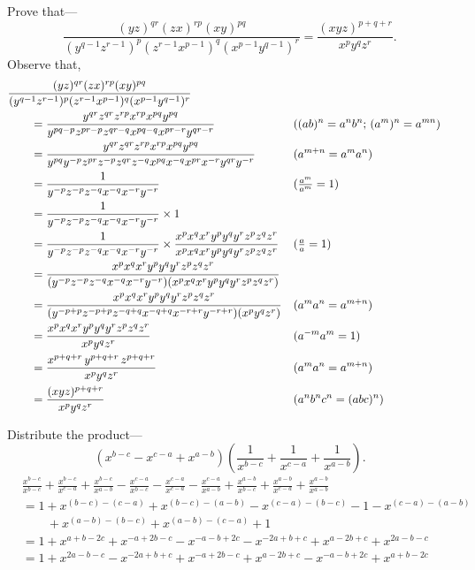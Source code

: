 \documentclass[DIN, pagenumber=false, fontsize=11pt, parskip=half]{scrartcl}
\begin{document}
\begin{problems}[from=1,step=1]
    \problem Prove that---
    \[
        \frac{(yz)^{qr} (zx)^{rp} (xy)^{pq}}{(y^{q-1} z^{r-1})^{p} (z^{r-1} x^{p-1})^{q} (x^{p-1} y^{q-1})^{r}} = \frac{(xyz)^{p+q+r}}{x^p y^q z^r}.
    \]
    \answer 
    Observe that,
    \begin{align*}
        \MoveEqLeft\frac{(yz)^{qr}(zx)^{rp}(xy)^{pq}}{(y^{q-1}z^{r-1})^p(z^{r-1}x^{p-1})^q(x^{p-1}y^{q-1})^r}\\ 
        & = \frac{y^{qr}z^{qr}z^{rp}x^{rp}x^{pq}y^{pq}}{y^{pq-p}z^{pr-p}z^{qr-q}x^{pq-q}x^{pr-r}y^{qr-r}} && \text{($(ab)^n = a^nb^n$; $(a^m)^n = a^{mn}$)}\\ 
        & = \frac{y^{qr}z^{qr}z^{rp}x^{rp}x^{pq}y^{pq}}{y^{pq}y^{-p}z^{pr}z^{-p}z^{qr}z^{-q}x^{pq}x^{-q}x^{pr}x^{-r}y^{qr}y^{-r}} && \text{($a^{m+n} = a^ma^n$)}\\ 
        &= \frac{1}{y^{-p}z^{-p}z^{-q}x^{-q}x^{-r}y^{-r}} && \text{($\tfrac{a^m}{a^m} = 1$)}\\ 
        &= \frac{1}{y^{-p}z^{-p}z^{-q}x^{-q}x^{-r}y^{-r}} \times 1\\ 
        &= \frac{1}{y^{-p}z^{-p}z^{-q}x^{-q}x^{-r}y^{-r}} \times \frac{x^px^qx^ry^py^qy^rz^pz^qz^r}{x^px^qx^ry^py^qy^rz^pz^qz^r} && \text{($\tfrac{a}{a} = 1$)}\\ 
        &= \frac{x^px^qx^ry^py^qy^rz^pz^qz^r}{(y^{-p}z^{-p}z^{-q}x^{-q}x^{-r}y^{-r})(x^px^qx^ry^py^qy^rz^pz^qz^r)}\\ 
        &= \frac{x^px^qx^ry^py^qy^rz^pz^qz^r}{(y^{-p+p}z^{-p+p}z^{-q+q}x^{-q+q}x^{-r+r}y^{-r+r})(x^py^qz^r)} && \text{($a^ma^n = a^{m+n}$)}\\ 
        &= \frac{x^px^qx^ry^py^qy^rz^pz^qz^r}{x^py^qz^r} && \text{($a^{-m}a^{m} = 1$)}\\ 
        &= \frac{x^{p+q+r}\,y^{p+q+r}\,z^{p+q+r}}{x^py^qz^r} && \text{($a^ma^n = a^{m+n}$)}\\ 
        &= \frac{(xyz)^{p+q+r}}{x^py^qz^r} && \text{($a^nb^nc^n = (abc)^n$)}
    \end{align*}

    \problem Distribute the product---
    \[
        (x^{b-c} - x^{c-a} + x^{a-b}) \left( \frac{1}{x^{b-c}} + \frac{1}{x^{c-a}} + \frac{1}{x^{a-b}} \right).
    \]
    \answer 
    \begin{align*}
        &\frac{x^{b-c}}{x^{b-c}} + \frac{x^{b-c}}{x^{c-a}} + \frac{x^{b-c}}{x^{a-b}}
        - \frac{x^{c-a}}{x^{b-c}} - \frac{x^{c-a}}{x^{c-a}} - \frac{x^{c-a}}{x^{a-b}}
        + \frac{x^{a-b}}{x^{b-c}} + \frac{x^{a-b}}{x^{c-a}} + \frac{x^{a-b}}{x^{a-b}}\\ 
        &= 1 + x^{(b-c)-(c-a)} + x^{(b-c)-(a-b)} - x^{(c-a)-(b-c)} - 1 - x^{(c-a)-(a-b)} \\
        &\qquad + x^{(a-b)-(b-c)} + x^{(a-b)-(c-a)} + 1\\  
        &= 1 + x^{a+b-2c} + x^{-a+2b-c} - x^{-a-b+2c} - x^{-2a+b+c} + x^{a-2b+c} + x^{2a-b-c} \\
        &= 1 + x^{2a-b-c} - x^{-2a+b+c} + x^{-a+2b-c} + x^{a-2b+c} - x^{-a-b+2c} + x^{a+b-2c} 
    \end{align*}


\end{problems}
\end{document}
